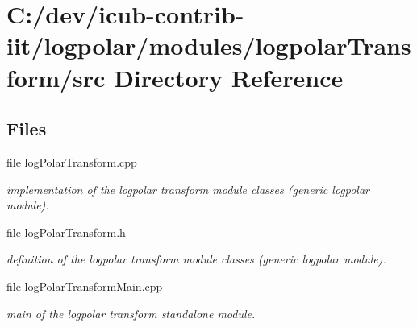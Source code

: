 \section{C\+:/dev/icub-\/contrib-\/iit/logpolar/modules/logpolar\+Transform/src Directory Reference}
\label{dir_c8063af17756bf327be829ed75f65a59}
\subsection*{Files}
\begin{DoxyCompactItemize}
\item 
file \hyperlink{logPolarTransform_8cpp}{log\+Polar\+Transform.\+cpp}
\begin{DoxyCompactList}\small\item\em implementation of the logpolar transform module classes (generic logpolar module). \end{DoxyCompactList}\item 
file \hyperlink{logPolarTransform_8h}{log\+Polar\+Transform.\+h}
\begin{DoxyCompactList}\small\item\em definition of the logpolar transform module classes (generic logpolar module). \end{DoxyCompactList}\item 
file \hyperlink{logPolarTransformMain_8cpp}{log\+Polar\+Transform\+Main.\+cpp}
\begin{DoxyCompactList}\small\item\em main of the logpolar transform standalone module. \end{DoxyCompactList}\end{DoxyCompactItemize}
